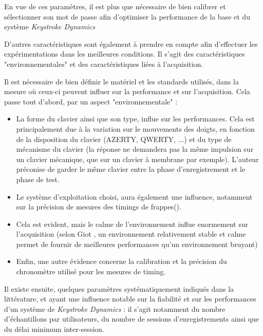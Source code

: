 En vue de ces paramètres, il est plus que nécessaire de bien calibrer et sélectionner son mot de passe afin d'optimiser la performance de la base et du système \textit{Keystroke Dynamics}

D'autres caractéristiques sont également à prendre en compte afin d'effectuer les expérimentations dans les meilleures conditions. Il s'agit des caractéristiques "environnementales" et des caractéristiques liées à l'acquisition.

Il est nécessaire de bien définir le matériel et les standards utilisés, dans la mesure où ceux-ci peuvent influer sur la performance et sur l'acquisition. Cela passe tout d'abord, par un aspect "environnementale" :

\begin{itemize}
\item La forme du clavier ainsi que son type, influe sur les performances. Cela est principalement due à la variation sur le mouvements des doigts, en fonction de la disposition du clavier (AZERTY, QWERTY, ...) et du type de mécanisme du clavier (la réponse ne demandera pas la même impulsion sur un clavier mécanique, que sur un clavier à membrane par exemple). L'auteur préconise de garder le même clavier entre la phase d'enregistrement et le phase de test.

\item Le système d'exploitation choisi, aura également une influence, notamment sur la précision de mesures des timings de frappes(\cite{giotBenchmark}).

\item Cela est evident, mais le calme de l'environnement influe enormement sur l'acquisition (selon Giot \cite{giotBenchmark}, un environnement relativement stable et calme permet de fournir de meilleures performances qu'un environnement bruyant)

\item Enfin, une autre évidence concerne la calibration et la précision du chronomètre utilisé pour les mesures de timing.

\end{itemize}

Il existe ensuite, quelques paramètres systématiquement indiqués dans la littérature, et ayant une influence notable sur la fiabilité et sur les performances d'un système de \textit{Keystroke Dynamics} : il s'agit notamment du nombre d'échantillons par utilisateurs, du nombre de sessions d'enregistrements ainsi que du délai minimum inter-session.

